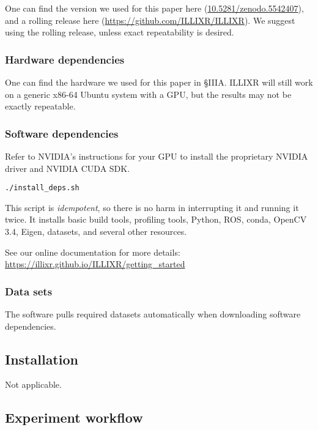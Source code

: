 \documentclass{sigplanconf}
\newcommand{\zenodo}{\footnotesize \url{10.5281/zenodo.5542407}}
\begin{document}
One can find the version we used for this paper here (\zenodo), and a rolling release here ({\footnotesize \url{https://github.com/ILLIXR/ILLIXR}}). We suggest using the rolling release, unless exact repeatability is desired.

\subsubsection{Hardware dependencies}

One can find the hardware we used for this paper in \S IIIA. ILLIXR will still work on a generic x86-64 Ubuntu system with a GPU, but the results may not be exactly repeatable.

\subsubsection{Software dependencies}

Refer to NVIDIA's instructions for your GPU to install the proprietary NVIDIA driver and NVIDIA CUDA SDK.

{
\small
\begin{verbatim}
./install_deps.sh
\end{verbatim}
}

This script is \textit{idempotent}, so there is no harm in interrupting it and running it twice. It installs basic build tools, profiling tools, Python, ROS, conda, OpenCV 3.4, Eigen, datasets, and several other resources.

See our online documentation for more details:\newline
{\footnotesize \url{https://illixr.github.io/ILLIXR/getting_started}}

\subsubsection{Data sets}

The software pulls required datasets automatically when downloading software dependencies.

\subsection{Installation}

Not applicable.

\subsection{Experiment workflow}
\end{document}
